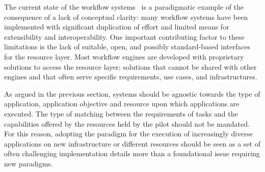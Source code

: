 \documentclass{sig-alternate}
\begin{document}


  The current state of the workflow
systems~\cite{taylor2014} is a paradigmatic example of the consequence of a lack
of conceptual clarity: many workflow systems have been implemented with
significant duplication of effort and limited means for extensibility and
interoperability. One important contributing factor to these limitations is the
lack of suitable, open, and possibly standard-based interfaces for the resource
layer. Most workflow engines are developed with proprietary solutions to access
the resource layer; solutions that cannot be shared with other engines and that
often serve specific requirements, use cases, and infrastructures.


As argued in the previous section, \pilot systems should be agnostic towards the
type of application, application objective and resource upon which applications
are executed. The type of matching between the requirements of tasks and the
capabilities offered by the resources held by the pilot should not be
mandated. For this reason, adopting the \pilot paradigm for the execution of
increasingly diverse applications on new infrastructure or different resources
should be seen as a set of often challenging implementation details more than a
foundational issue requiring new paradigms.



\end{document}

